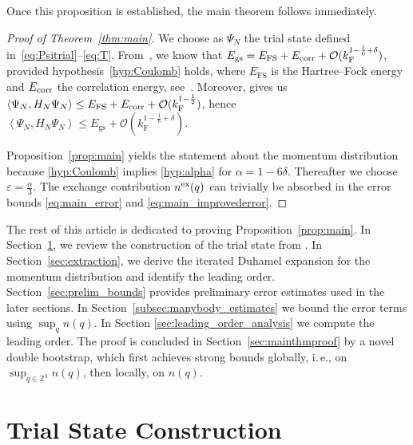 \documentclass[12pt,a4paper]{article}
\numberwithin{equation}{section}
\newcommand{\cO}{\mathcal{O}}
\newcommand{\Zbb}{\mathbb{Z}}
\newcommand{\1}{\mathbb{I}}
\newcommand{\corr}{\textnormal{corr}}
\newcommand{\F}{\mathrm{F}}
\newcommand{\FS}{\mathrm{FS}}
\newcommand{\GS}{\mathrm{gs}}
\newcommand{\kF}{k_\F}
\newcommand{\eva}[1]{\left\langle #1 \right\rangle}
\theoremstyle{plain}
\theoremstyle{definition}
\theoremstyle{remark}
\theoremstyle{plain}
\theoremstyle{definition}
\theoremstyle{remark}
\begin{document}
Once this proposition is established, the main theorem follows immediately.

\begin{proof}[Proof of Theorem~\ref{thm:main}]
We choose as $ \Psi_N $ the trial state defined in~\eqref{eq:Psitrial}--\eqref{eq:T}.
From~\cite[Corr.~1.3]{CHN24}, we know that $ E_{\GS} = E_{\FS} + E_{\corr} + \cO(\kF^{1 - \frac{1}{6} + \delta}) $, provided hypothesis~\eqref{hyp:Coulomb} holds, where $ E_{\FS} $ is the Hartree--Fock energy and $ E_{\corr}$ the correlation energy, see~\cite[Eqs.~(1.2) and (1.11)]{CHN24}. Moreover, \cite[Thm.~1.1]{CHN23} gives us $ \eva{\Psi_N, H_N \Psi_N} \le E_{\FS} + E_{\corr} + \cO(\kF^{1 - \frac{1}{2}}) $, hence $ \eva{\Psi_N, H_N \Psi_N} \le E_{\GS} + \cO(\kF^{1 - \frac{1}{6}+ \delta}) $.

Proposition~\ref{prop:main} yields the statement about the momentum distribution because \eqref{hyp:Coulomb} implies \eqref{hyp:alpha} for $\alpha = 1-6\delta$. Thereafter we choose $\varepsilon = \frac{\alpha}{3}$. The exchange contribution $n^\textnormal{ex}(q)$ can trivially be absorbed in the error bounds \eqref{eq:main_error} and \eqref{eq:main_improvederror}.
\end{proof}


The rest of this article is dedicated to proving Proposition~\ref{prop:main}.
In Section~\ref{sec:trialstate}, we review the construction of the trial state from \cite{CHN23}. In Section~\ref{sec:extraction}, we derive the iterated Duhamel expansion for the momentum distribution and identify the leading order. Section~\ref{sec:prelim_bounds} provides preliminary error estimates used in the later sections. In Section~\ref{subsec:manybody_estimates} we bound the error terms using $\sup_q n(q)$. In Section \ref{sec:leading_order_analysis} we compute the leading order. The proof is concluded in Section~\ref{sec:mainthmproof} by a novel double bootstrap, which first achieves strong bounds globally, i.\,e., on $\sup_{q \in \Zbb^3} n(q)$, then locally, on $n(q)$.



\section{Trial State Construction}
\label{sec:trialstate}
\end{document}
